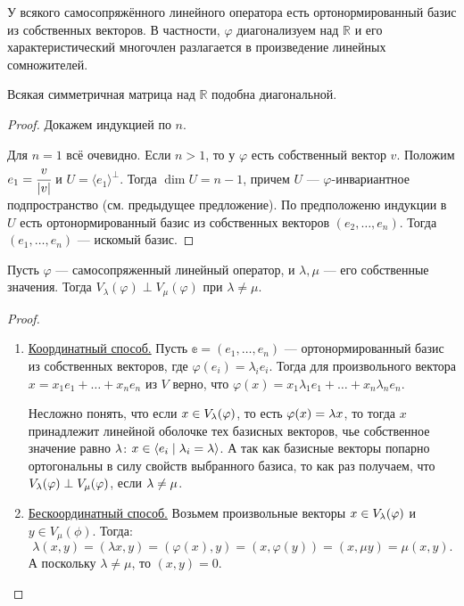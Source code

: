 \begin{Theorem}
	У всякого самосопряжённого линейного оператора есть ортонормированный базис из собственных векторов. В частности, $\varphi$ диагонализуем над $\mathbb{R}$ и его характеристический многочлен разлагается в произведение линейных сомножителей.
\end{Theorem}

\begin{Consequence}
	Всякая симметричная матрица над $\mathbb{R}$ подобна диагональной.
\end{Consequence}

\begin{proof}
	Докажем индукцией по $n$.
	
	Для $n = 1$ всё очевидно. Если $n > 1$, то у $\varphi$ есть собственный вектор $v$. Положим $e_1 = \cfrac{v}{|v|}$ и $U = \langle e_1\rangle^\perp$. Тогда $\dim U = n - 1$, причем $U$ --- $\varphi$-инвариантное подпространство (см. предыдущее предложение). По предположеню индукции в $U$ есть ортонормированный базис из собственных векторов $(e_2,\ldots, e_n)$. Тогда $(e_1,\ldots, e_n)$ --- искомый базис.
\end{proof}

\begin{Consequence}
	Пусть $\varphi$ --- самосопряженный линейный оператор, и $\lambda, \mu$ --- его собственные значения. Тогда $V_\lambda(\varphi)\perp V_\mu(\varphi)$ при $\lambda \neq \mu$.
\end{Consequence}

\begin{proof}\ 
	\begin{enumerate} 
		\item \underline{Координатный способ.} Пусть $\mathbb{e} = (e_1, \ldots, e_n)$ --- ортонормированный базис из собственных векторов, где $\varphi(e_i) = \lambda_ie_i$. Тогда для произвольного вектора $x = x_1e_1 + \ldots + x_ne_n$ из $V$ верно, что $\varphi(x) = x_1\lambda_1 e_1 + \ldots + x_n \lambda_n e_n$.
		
		Несложно понять, что если $x \in V_\lambda(\varphi)$, то есть $\varphi(x) = \lambda x$, то тогда $x$ принадлежит линейной оболочке тех базисных векторов, чье собственное значение равно $\lambda$: $x \in \langle e_i \mid \lambda_i = \lambda \rangle$. А так как базисные векторы попарно ортогональны в силу свойств выбранного базиса, то как раз получаем, что $V_\lambda(\varphi) \perp V_\mu(\varphi)$, если $\lambda \neq \mu$.
		\item \underline{Бескоординатный способ.} Возьмем произвольные векторы $x \in V_\lambda(\varphi)$ и $y \in V_\mu(\phi)$. Тогда:
		$$
			\lambda(x,y) = (\lambda x, y) = (\varphi(x), y) = (x, \varphi(y)) = (x, \mu y) = \mu (x, y).
		$$
		А поскольку $\lambda \neq \mu$, то $(x,y) = 0$.
	\end{enumerate}
\end{proof}

